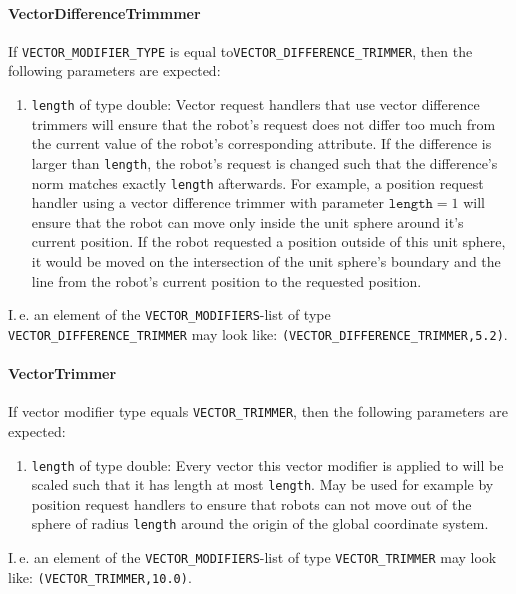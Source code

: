 \paragraph{VectorDifferenceTrimmmer}
If \texttt{VECTOR\_MODIFIER\_TYPE} is equal to\newline \texttt{VECTOR\_DIFFERENCE\_TRIMMER}, then the following parameters are expected:
\begin{enumerate}
	\item \texttt{length} of type double: Vector request handlers that use vector difference trimmers will ensure that the robot's request does not differ too much from the current value of the robot's corresponding attribute. If the difference is larger than \texttt{length}, the robot's request is changed such that the difference's norm matches exactly \texttt{length} afterwards. For example, a position request handler using a vector difference trimmer with parameter $\texttt{length}=1$ will ensure that the robot can move only inside the unit sphere around it's current position. If the robot requested a position outside of this unit sphere, it would be moved on the intersection of the unit sphere's boundary and the line from the robot's current position to the requested position.
\end{enumerate}
I.\,e. an element of the \texttt{VECTOR\_MODIFIERS}-list of type \texttt{VECTOR\_DIFFERENCE\_TRIMMER} may look like: \texttt{(VECTOR\_DIFFERENCE\_TRIMMER,5.2)}.

\paragraph{VectorTrimmer} If vector modifier type equals \texttt{VECTOR\_TRIMMER}, then the following parameters are expected:
\begin{enumerate}
	\item \texttt{length} of type double: Every vector this vector modifier is applied to will be scaled such that it has length at most \texttt{length}. May be used for example by position request handlers to ensure that robots can not move out of the sphere of radius \texttt{length} around the origin of the global coordinate system.
\end{enumerate}
I.\,e. an element of the \texttt{VECTOR\_MODIFIERS}-list of type \texttt{VECTOR\_TRIMMER} may look like: \texttt{(VECTOR\_TRIMMER,10.0)}.

